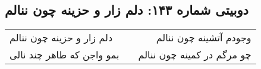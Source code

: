 \begin{center}
\section*{دوبیتی شماره ۱۴۳: دلم زار و حزینه چون ننالم}
\label{sec:143}
\begin{longtable}{l p{0.5cm} r}
دلم زار و حزینه چون ننالم
&&
وجودم آتشینه چون ننالم
\\
بمو واجن که طاهر چند نالی
&&
چو مرگم در کمینه چون ننالم
\\
\end{longtable}
\end{center}

